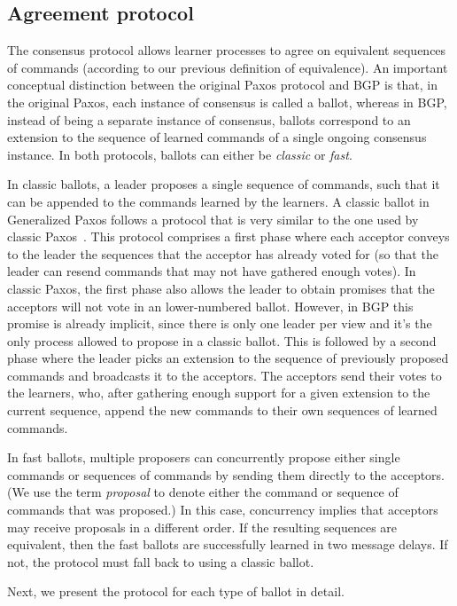 \subsection{Agreement protocol} 

The consensus protocol allows learner processes to agree on equivalent sequences of commands (according to our previous definition of equivalence).
An important conceptual distinction between the original Paxos protocol and BGP is that, in the original Paxos, each instance of consensus is called a ballot, whereas in BGP, instead of being a separate instance of consensus, 
ballots correspond to an extension to the sequence of learned commands of a single ongoing consensus instance.
In both protocols, ballots can either be \textit{classic} or \textit{fast}. 


In classic ballots, a leader proposes a single sequence of commands, such that it can be appended to the commands learned by the learners. 
A classic ballot in Generalized Paxos follows a protocol that is very similar to the one used by classic Paxos~\cite{Lam98}. This protocol comprises a first phase where each acceptor conveys to the leader the sequences that the acceptor has already voted for (so that the leader can resend commands that may not have gathered enough votes). In classic Paxos, the first phase also allows the leader to obtain promises that the acceptors will not vote in an lower-numbered ballot. However, in BGP this promise is already implicit, since there is only one leader per view and it's the only process allowed to propose in a classic ballot. This is followed by a second phase where the leader picks an extension to the sequence of previously proposed commands and broadcasts it to the acceptors. The acceptors send their votes to the learners, who, after gathering enough support for a given extension to the current sequence, append the new commands to their own sequences of learned commands.

In fast ballots, multiple proposers can concurrently propose either single commands or sequences of commands by sending them directly to the acceptors. (We use the term \textit{proposal} to denote either the command or sequence of commands that was proposed.)
In this case, concurrency implies that acceptors may receive proposals in a different order. If the resulting sequences are equivalent, then the fast ballots are successfully learned in two message delays. If not, the protocol must fall back to using a classic ballot.

Next, we present the protocol for each type of ballot in detail.

